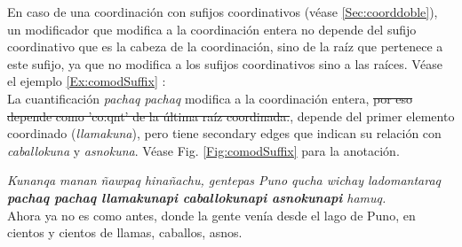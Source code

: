 \documentclass[a4paper,11pt,DIV12]{scrartcl}
\begin{document}
\begin{center}
\begin{minipage}{0.5\textwidth}
\begin{center}
{}
\end{center}
\end{minipage}
\end{center}

En caso de una coordinaci\'on con sufijos coordinativos (v\'ease \ref{Sec:coorddoble}), un modificador que modifica a la coordinaci\'on entera no depende del sufijo coordinativo que es la cabeza de la coordinaci\'on, sino de la ra\'iz que pertenece a este sufijo, ya que no modifica a los sufijos coordinativos sino a las ra\'ices. V\'ease el ejemplo \ref{Ex:comodSuffix} :\\
La cuantificaci\'on {\em pachaq pachaq} modifica a la coordinaci\'on entera, \sout{por eso depende como 'co:qnt' de la \'ultima ra\'iz coordinada.}, depende del primer elemento coordinado ({\em llamakuna}), pero tiene secondary edges que indican su relaci\'on con {\em caballokuna} y {\em asnokuna}. V\'ease Fig. \ref{Fig:comodSuffix} para la anotaci\'on.

\begin{examples}
 \item\label{Ex:comodSuffix} {\em Kunanqa manan ñawpaq hinañachu, gentepas Puno qucha wichay ladomantaraq \textbf{pachaq pachaq llamakunapi caballokunapi asnokunapi} hamuq.}\\
	Ahora ya no es como antes, donde la gente venía desde el lago de Puno, en cientos y cientos de llamas, caballos, asnos.\\
	  	\hfill{\small \citep{Valderrama77}}
\end{examples}
\end{document}
